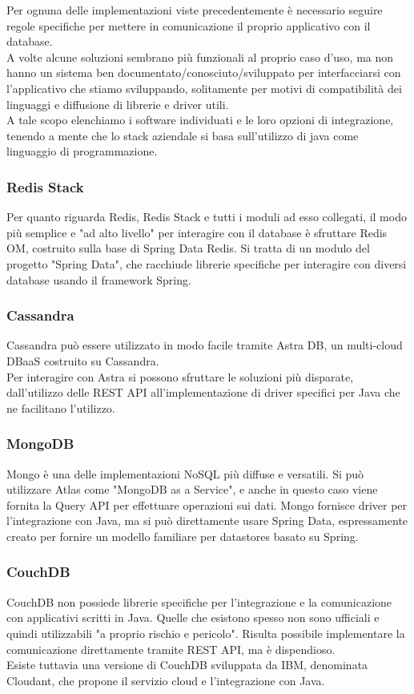\noindent Per ognuna delle implementazioni viste precedentemente è necessario seguire regole specifiche per mettere in comunicazione il proprio applicativo con il database.\\
A volte alcune soluzioni sembrano più funzionali al proprio caso d'uso, ma non hanno un sistema ben documentato/conosciuto/sviluppato per interfacciarsi con l'applicativo che stiamo sviluppando, solitamente per motivi di compatibilità dei linguaggi e diffusione di librerie e driver utili.\\
A tale scopo elenchiamo i software individuati e le loro opzioni di integrazione, tenendo a mente che lo stack aziendale si basa sull'utilizzo di java come linguaggio di programmazione.

\subsubsection{Redis Stack}
Per quanto riguarda Redis, Redis Stack e tutti i moduli ad esso collegati, il modo più semplice e "ad alto livello" per interagire con il database è sfruttare Redis OM, costruito sulla base di Spring Data Redis. Si tratta di un modulo del progetto "Spring Data", che racchiude librerie specifiche per interagire con diversi database usando il framework Spring.

\subsubsection{Cassandra}
Cassandra può essere utilizzato in modo facile tramite Astra DB, un multi-cloud DBaaS costruito su Cassandra.\\
Per interagire con Astra si possono sfruttare le soluzioni più disparate, dall'utilizzo delle REST API all'implementazione di driver specifici per Java che ne facilitano l'utilizzo.

\subsubsection{MongoDB}
Mongo è una delle implementazioni NoSQL più diffuse e versatili. Si può utilizzare Atlas come "MongoDB as a Service", e anche in questo caso viene fornita la Query API per effettuare operazioni sui dati. Mongo fornisce driver per l'integrazione con Java, ma si può direttamente usare Spring Data, espressamente creato per fornire un modello familiare per datastores basato su Spring.

\subsubsection{CouchDB}
CouchDB non possiede librerie specifiche per l'integrazione e la comunicazione con applicativi scritti in Java. Quelle che esistono spesso non sono ufficiali e quindi utilizzabili "a proprio rischio e pericolo". Risulta possibile implementare la comunicazione direttamente tramite REST API, ma è dispendioso.\\
Esiste tuttavia una versione di CouchDB sviluppata da IBM, denominata Cloudant, che propone il servizio cloud e l'integrazione con Java.


